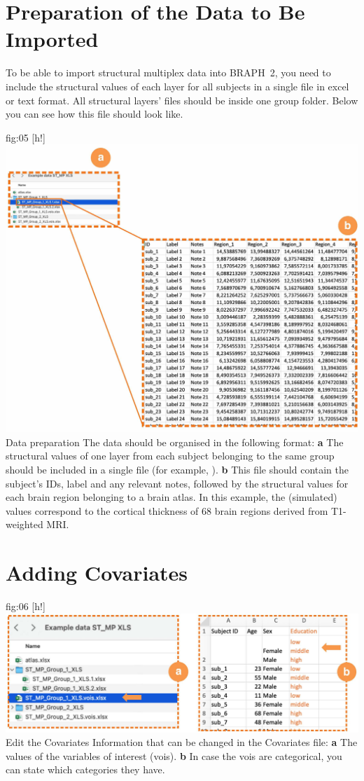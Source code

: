 \documentclass[justified]{tufte-handout}
\begin{document}

\clearpage
\section{Preparation of the Data to Be Imported}

To be able to import structural multiplex data into BRAPH~2, you need to include the structural values of each layer for all subjects in a single file in excel or text format. All structural layers' files should be inside one group folder. Below you can see how this file should look like.

	{fig:05}
	{
	[h!]
	\includegraphics{fig05.jpg}
	}
	{Data preparation}
	{
	The data should be organised in the following format:
	{\bf a} The structural values of one layer from each subject belonging to the same group should be included in a single file (for example, ). 
	{\bf b} This file should contain the subject's IDs, label and any relevant notes, followed by the structural values for each brain region belonging to a brain atlas. In this example, the (simulated) values correspond to the cortical thickness of 68 brain regions derived from T1-weighted MRI.
	}


\section{Adding Covariates}

	{fig:06}
	{
	[h!]
	\includegraphics{fig06.jpg}
	}
	{Edit the Covariates}
	{
	Information that can be changed in the Covariates file: 
	{\bf a} The values of the variables of interest (vois).
	{\bf b} In case the vois are categorical, you can state which categories they have.
	}
	
\end{document}
